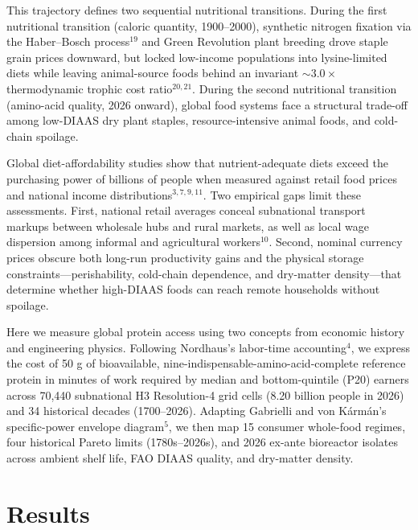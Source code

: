 \documentclass[11pt,a4paper]{article}
\begin{document}
This trajectory defines two sequential nutritional transitions. During the first nutritional transition (caloric quantity, 1900--2000), synthetic nitrogen fixation via the Haber--Bosch process$^{19}$ and Green Revolution plant breeding drove staple grain prices downward, but locked low-income populations into lysine-limited diets while leaving animal-source foods behind an invariant $\sim 3.0\times$ thermodynamic trophic cost ratio$^{20,21}$. During the second nutritional transition (amino-acid quality, 2026 onward), global food systems face a structural trade-off among low-DIAAS dry plant staples, resource-intensive animal foods, and cold-chain spoilage.

Global diet-affordability studies show that nutrient-adequate diets exceed the purchasing power of billions of people when measured against retail food prices and national income distributions$^{3,7,9,11}$. Two empirical gaps limit these assessments. First, national retail averages conceal subnational transport markups between wholesale hubs and rural markets, as well as local wage dispersion among informal and agricultural workers$^{10}$. Second, nominal currency prices obscure both long-run productivity gains and the physical storage constraints---perishability, cold-chain dependence, and dry-matter density---that determine whether high-DIAAS foods can reach remote households without spoilage.

Here we measure global protein access using two concepts from economic history and engineering physics. Following Nordhaus's labor-time accounting$^4$, we express the cost of 50 g of bioavailable, nine-indispensable-amino-acid-complete reference protein in minutes of work required by median and bottom-quintile (P20) earners across 70,440 subnational H3 Resolution-4 grid cells (8.20 billion people in 2026) and 34 historical decades (1700--2026). Adapting Gabrielli and von K\'arm\'an's specific-power envelope diagram$^5$, we then map 15 consumer whole-food regimes, four historical Pareto limits (1780s--2026s), and 2026 ex-ante bioreactor isolates across ambient shelf life, FAO DIAAS quality, and dry-matter density.

\section*{Results}
\end{document}
